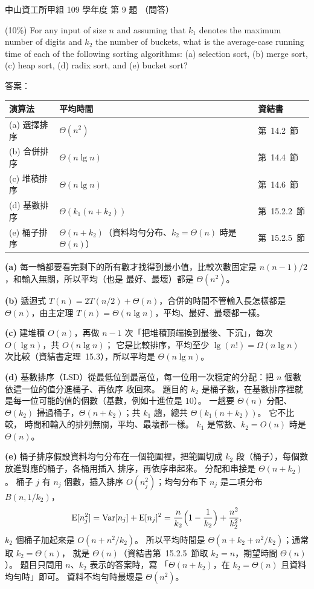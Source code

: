 \begin{pastexam}[label={px:nsysu-109-osds-03}]{中山資工所甲組 109 學年度 第 9 題}
（問答）

(10\%) For any input of size $n$ and assuming that $k_1$ denotes the maximum number of digits and
$k_2$ the number of buckets, what is the average-case running time of each of the following sorting
algorithms: (a) selection sort, (b) merge sort, (c) heap sort, (d) radix sort, and (e) bucket sort?
\end{pastexam}

\begin{pastsoln}
答案：
\begin{center}
\begin{tabular}{lll}
\toprule
演算法 & 平均時間 & 資結書 \\
\midrule
(a) 選擇排序 & $\Theta(n^2)$ & 第~14.2~節 \\
(b) 合併排序 & $\Theta(n \lg n)$ & 第~14.4~節 \\
(c) 堆積排序 & $\Theta(n \lg n)$ & 第~14.6~節 \\
(d) 基數排序 & $\Theta(k_1(n + k_2))$ & 第~15.2.2~節 \\
(e) 桶子排序 & $\Theta(n + k_2)$（資料均勻分布、$k_2 = \Theta(n)$ 時是 $\Theta(n)$） & 第~15.2.5~節 \\
\bottomrule
\end{tabular}
\end{center}

\textbf{(a)} 每一輪都要看完剩下的所有數才找得到最小值，比較次數固定是 $n(n-1)/2$，和輸入無關，所以平均（也是
最好、最壞）都是 $\Theta(n^2)$。

\textbf{(b)} 遞迴式 $T(n) = 2T(n/2) + \Theta(n)$，合併的時間不管輸入長怎樣都是 $\Theta(n)$，由主定理
$T(n) = \Theta(n \lg n)$，平均、最好、最壞都一樣。

\textbf{(c)} 建堆積 $O(n)$，再做 $n - 1$ 次「把堆積頂端換到最後、下沉」，每次 $O(\lg n)$，共 $O(n \lg n)$；
它是比較排序，平均至少 $\lg(n!) = \Omega(n \lg n)$ 次比較（資結書定理~15.3），所以平均是 $\Theta(n \lg n)$。

\textbf{(d)} 基數排序（LSD）從最低位到最高位，每一位用一次穩定的分配：把 $n$ 個數依這一位的值分進桶子、再依序
收回來。 題目的 $k_2$ 是桶子數，在基數排序裡就是每一位可能的值的個數（基數，例如十進位是 $10$）。 一趟要
$\Theta(n)$ 分配、$\Theta(k_2)$ 掃過桶子，$\Theta(n + k_2)$；共 $k_1$ 趟，總共 $\Theta(k_1(n + k_2))$。 它不比較，
時間和輸入的排列無關，平均、最壞都一樣。 $k_1$ 是常數、$k_2 = O(n)$ 時是 $\Theta(n)$。

\textbf{(e)} 桶子排序假設資料均勻分布在一個範圍裡，把範圍切成 $k_2$ 段（桶子），每個數放進對應的桶子，各桶用插入
排序，再依序串起來。 分配和串接是 $\Theta(n + k_2)$。 桶子 $j$ 有 $n_j$ 個數，插入排序 $O(n_j^2)$；均勻分布下
$n_j$ 是二項分布 $B(n, 1/k_2)$，
\[
\mathrm{E}[n_j^2] = \mathrm{Var}[n_j] + \mathrm{E}[n_j]^2 = \frac{n}{k_2}\Bigl(1 - \frac{1}{k_2}\Bigr) + \frac{n^2}{k_2^2},
\]
$k_2$ 個桶子加起來是 $O(n + n^2/k_2)$。 所以平均時間是 $\Theta(n + k_2 + n^2/k_2)$；通常取 $k_2 = \Theta(n)$，
就是 $\Theta(n)$（資結書第~15.2.5~節取 $k_2 = n$，期望時間 $\Theta(n)$）。 題目只問用 $n$、$k_2$ 表示的答案時，寫
「$\Theta(n + k_2)$，在 $k_2 = \Theta(n)$ 且資料均勻時」即可。 資料不均勻時最壞是 $\Theta(n^2)$。
\end{pastsoln}

